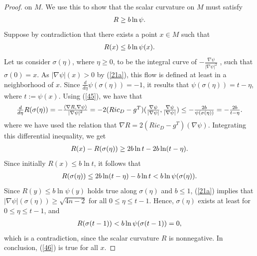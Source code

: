 \documentclass[12pt]{amsart}%
\numberwithin{equation}{section}
\begin{document}
\begin{proof}
on $M.$ We use this to show that the scalar curvature on $M$ must satisfy%
\begin{equation}%
\begin{array}
[c]{c}%
R\geq b\ln\psi.
\end{array}
\label{46}%
\end{equation}
Suppose by contradiction that there exists a point $x\in M$ such that%
\[%
\begin{array}
[c]{c}%
R(x)\leq b\ln\psi(x).
\end{array}
\]
Let us consider $\sigma(\eta)$, where $\eta\geq0$, to be the integral curve of
$-\frac{\nabla\psi}{|\nabla\psi|^{2}}$ , such that $\sigma(0)=x$. As
$|\nabla\psi|(x)>0$ by (\ref{21a}), this flow is defined at least in a
neighborhood of $x$. Since $\frac{d}{d\eta}\psi(\sigma(\eta))=-1$, it results
that $\psi(\sigma(\eta))=t-\eta$, where $t:=\psi(x)$. Using (\ref{45}), we
have that
\[%
\begin{array}
[c]{c}%
\frac{d}{d\eta}R(\sigma(\eta))=-\frac{\left\langle \nabla R,\nabla
\psi\right\rangle }{|\nabla\psi|^{2}}=-2(Ric_{D}-g^{T})(\frac{\nabla\psi
}{|\nabla\psi|},\frac{\nabla\psi}{|\nabla\psi|})\leq-\frac{2b}{\psi
(\sigma(\eta))}=-\frac{2b}{t-\eta}.
\end{array}
\]
where we have used the relation that $\nabla R=2(Ric_{D}-g^{T})(\nabla\psi).$
Integrating this differential inequality, we get
\begin{equation}%
\begin{array}
[c]{c}%
R(x)-R(\sigma(\eta))\geq2b\ln t-2b\ln(t-\eta).
\end{array}
\label{47}%
\end{equation}
Since initially $R(x)\leq b\ln t$, it follows that%
\[%
\begin{array}
[c]{c}%
R(\sigma(\eta))\leq2b\ln(t-\eta)-b\ln t<b\ln\psi(\sigma(\eta)).
\end{array}
\]
Since $R(y)\leq b\ln\psi(y)$ holds true along $\sigma(\eta)$ and $b\leq1$,
(\ref{21a}) implies that $|\nabla\psi|(\sigma(\eta))\geq\sqrt{4n-2}$ for all
$0\leq\eta\leq t-1$. Hence, $\sigma(\eta)$ exists at least for $0\leq\eta\leq
t-1$, and
\[%
\begin{array}
[c]{c}%
R(\sigma(t-1))<b\ln\psi(\sigma(t-1))=0,
\end{array}
\]
which is a contradiction, since the scalar curvature $R$ is nonnegative. In
conclusion, (\ref{46}) is true for all $x$.


\end{proof}
\end{document}
